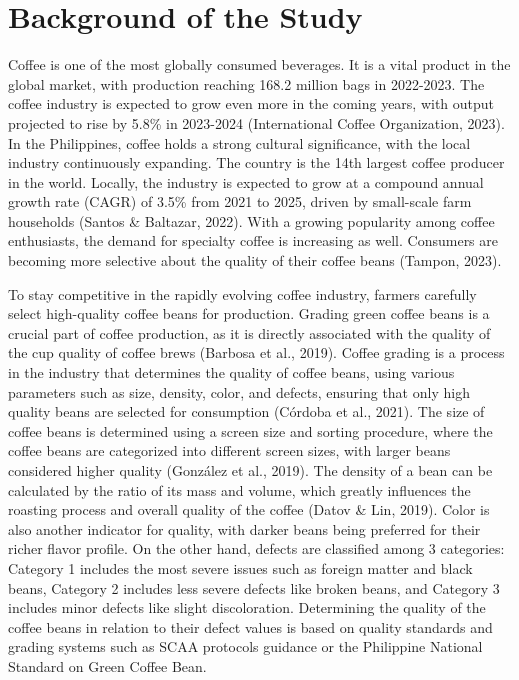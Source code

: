\section{Background of the Study}

Coffee is one of the most globally consumed beverages. It is a vital product in the global market, with production reaching 168.2 million bags in 2022-2023. The coffee industry is expected to grow even more in the coming years, with output projected to rise by 5.8\% in 2023-2024 (International Coffee Organization, 2023). In the Philippines, coffee holds a strong cultural significance, with the local industry continuously expanding. The country is the 14th largest coffee producer in the world. Locally, the industry is expected to grow at a compound annual growth rate (CAGR) of 3.5\% from 2021 to 2025, driven by small-scale farm households (Santos \& Baltazar, 2022). With a growing popularity among coffee enthusiasts, the demand for specialty coffee is increasing as well. Consumers are becoming more selective about the quality of their coffee beans (Tampon, 2023).  

To stay competitive in the rapidly evolving coffee industry, farmers carefully select high-quality coffee beans for production. Grading green coffee beans is a crucial part of coffee production, as it is directly associated with the quality of the cup quality of coffee brews (Barbosa et al., 2019). Coffee grading is a process in the industry that determines the quality of coffee beans, using various parameters such as size, density, color, and defects, ensuring that only high quality beans are selected for consumption (Córdoba et al., 2021). The size of coffee beans is determined using a screen size and sorting procedure, where the coffee beans are categorized into different screen sizes, with larger beans considered higher quality (González et al., 2019). The density of a bean can be calculated by the ratio of its mass and volume, which greatly influences the roasting process and overall quality of the coffee (Datov \& Lin, 2019). Color is also another indicator for quality, with darker beans being preferred for their richer flavor profile. On the other hand, defects are classified among 3 categories: Category 1 includes the most severe issues such as foreign matter and black beans, Category 2 includes less severe defects like broken beans, and Category 3 includes minor defects like slight discoloration. Determining the quality of the coffee beans in relation to their defect values is based on quality standards and grading systems such as SCAA protocols guidance or the Philippine National Standard on Green Coffee Bean. 

